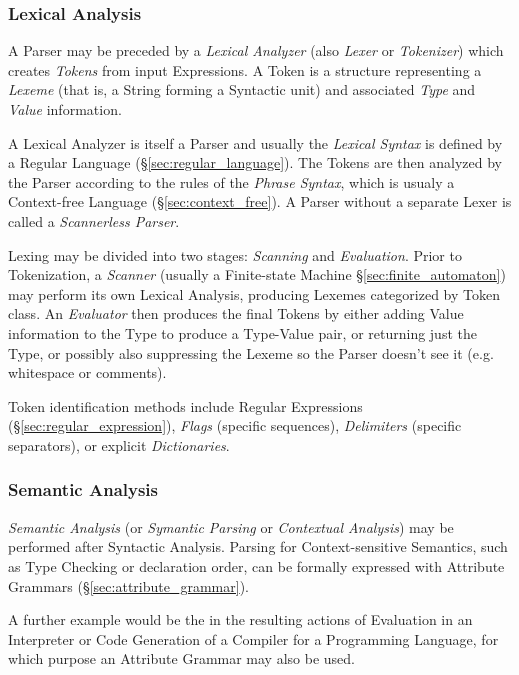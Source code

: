 \subsubsection{Lexical Analysis}\label{sec:lexical_analysis}

A Parser may be preceded by a \emph{Lexical Analyzer} (also
\emph{Lexer} or \emph{Tokenizer}) which creates \emph{Tokens} from
input Expressions. A Token is a structure representing a \emph{Lexeme}
(that is, a String forming a Syntactic unit) and associated
\emph{Type} and \emph{Value} information.

A Lexical Analyzer is itself a Parser and usually the \emph{Lexical
  Syntax} is defined by a Regular Language
(\S\ref{sec:regular_language}). The Tokens are then analyzed by the
Parser according to the rules of the \emph{Phrase Syntax}, which is
usualy a Context-free Language (\S\ref{sec:context_free}). A Parser
without a separate Lexer is called a \emph{Scannerless Parser}.

Lexing may be divided into two stages: \emph{Scanning} and
\emph{Evaluation}. Prior to Tokenization, a \emph{Scanner} (usually a
Finite-state Machine \S\ref{sec:finite_automaton}) may perform its own
Lexical Analysis, producing Lexemes categorized by Token class. An
\emph{Evaluator} then produces the final Tokens by either adding Value
information to the Type to produce a Type-Value pair, or returning
just the Type, or possibly also suppressing the Lexeme so the Parser
doesn't see it (e.g. whitespace or comments).

Token identification methods include Regular Expressions
(\S\ref{sec:regular_expression}), \emph{Flags} (specific sequences),
\emph{Delimiters} (specific separators), or explicit
\emph{Dictionaries}.



\subsubsection{Semantic Analysis}\label{sec:semantic_analysis}

\emph{Semantic Analysis} (or \emph{Symantic Parsing} or
\emph{Contextual Analysis}) may be performed after Syntactic Analysis.
Parsing for Context-sensitive Semantics, such as Type Checking or
declaration order, can be formally expressed with Attribute Grammars
(\S\ref{sec:attribute_grammar}).

A further example would be the in the resulting actions of Evaluation
in an Interpreter or Code Generation of a Compiler for a Programming
Language, for which purpose an Attribute Grammar may also be used.



